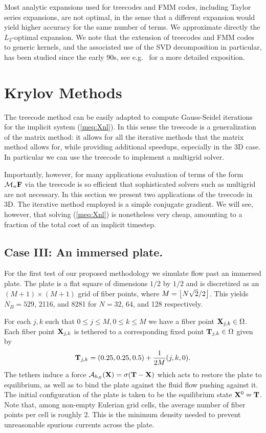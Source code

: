 Most analytic expansions used for treecodes and FMM codes, including Taylor series expansions, are not optimal, in the sense that a different expansion would yield higher accuracy for the same number of terms. We approximate directly the $L_2$-optimal expansion. We note that the extension of treecodes and FMM codes to generic kernels, and the associated use of the SVD decomposition in particular, has been studied since the early 90s, see e.g.~\cite{SVDFMM_GimbutasEtAl} for a more detailed exposition.


\section{Krylov Methods}
\label{sec:KrylovMethods}
The treecode method can be easily adapted to compute Gauss-Seidel iterations for the implicit system (\ref{meq:Xnl}). In this sense the treecode is a generalization of the matrix method: it allows for all the iterative methods that the matrix method allows for, while providing additional speedups, especially in the 3D case. In particular we can use the treecode to implement a multigrid solver.

Importantly, however, for many applications evaluation of terms of the form $\mathcal{M}_n\mathbf{F}$ via the treecode is so efficient that sophisticated solvers such as multigrid are not necessary. In this section we present two applications of the treecode in 3D. The iterative method employed is a simple conjugate gradient. We will see, however, that solving (\ref{meq:Xnl}) is nonetheless very cheap, amounting to a fraction of the total cost of an implicit timestep.


\subsection{Case III: An immersed plate.}
\label{sub:plate}
For the first test of our proposed methodology we simulate flow past an immersed plate. The plate is a flat square of dimensions $1/2$ by $1/2$ and is discretized as an $(M+1)\times (M+1)$ grid of fiber points, where $M = \left\lfloor N\sqrt{2}/2 \right\rfloor$. This yields $N_B=529$, 2116, and 8281 for $N=32$, 64, and 128 respectively.

For each $j,k$ such that $0 \leq j \leq M, 0 \leq k \leq M$ we have a fiber point $\mathbf{X}_{j,k}\in\Omega$. Each fiber point $\mathbf{X}_{j,k}$ is tethered to a corresponding fixed point $\mathbf{T}_{j,k}\in\Omega$ given by
\begin{equation}
\mathbf{T}_{j,k}= (0.25,0.25,0.5) + \frac{1}{2M} (j, k, 0).
\end{equation}
The tethers induce a force $\mathcal{A}_{h_B}(\mathbf{X}) = \sigma(\mathbf{T} - \mathbf{X})$ which acts to restore the plate to equilibrium, as well as to bind the plate against the fluid flow pushing against it. The initial configuration of the plate is taken to be the equilibrium state $\mathbf{X}^0 = \mathbf{T}$. Note that, among non-empty Eulerian grid cells, the average number of fiber points per cell is roughly $2$. This is the minimum density needed to prevent unreasonable spurious currents across the plate.

